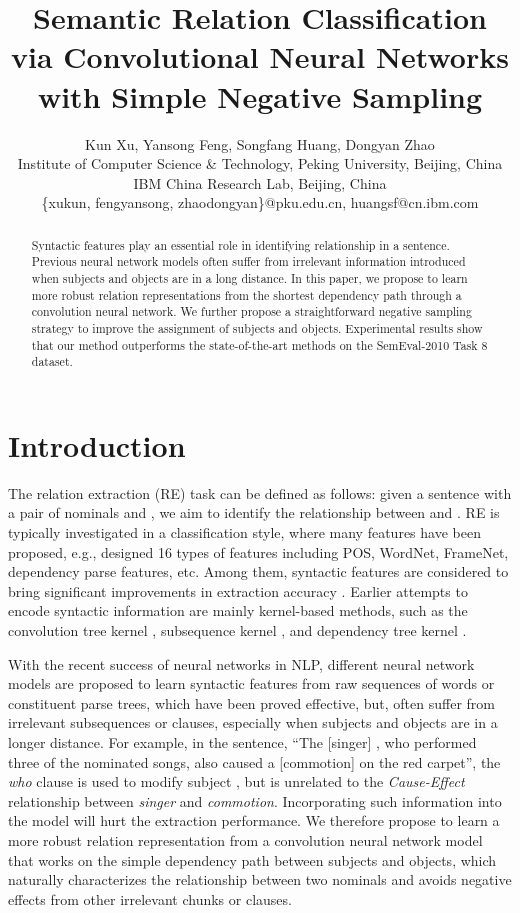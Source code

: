 \documentclass[11pt,a4paper]{article}
\title{Semantic Relation Classification via Convolutional Neural Networks with Simple Negative Sampling}
\author{Kun Xu, Yansong Feng, Songfang Huang, Dongyan Zhao\\
Institute of Computer Science \& Technology, Peking University, Beijing, China\\
IBM China Research Lab, Beijing, China \\
\{xukun, fengyansong, zhaodongyan\}@pku.edu.cn,  huangsf@cn.ibm.com\\
}
\date{}
\begin{document}
\maketitle
\begin{abstract}
Syntactic features play an essential role in identifying relationship in a sentence. Previous neural network models 
often suffer from irrelevant information introduced
when subjects and objects are in a long distance.  
In this paper, we propose to learn more robust relation representations from the shortest dependency path through a 
convolution neural network. We further propose
a straightforward negative sampling strategy to improve the assignment of subjects and objects.  
Experimental results show that our method outperforms the state-of-the-art methods on the SemEval-2010 Task 8 dataset.
\end{abstract}

\section{Introduction}
The relation extraction (RE) task can be defined as follows: given a sentence  with a pair of nominals  and , we aim to identify the relationship between  and . RE is typically investigated in a classification style, where many features have been proposed, e.g.,  
designed 16 types of features including POS, WordNet, FrameNet, dependency parse features, etc. Among them,  syntactic features are considered to bring significant improvements in extraction accuracy \cite{DBLP:conf/naacl/BunescuM05}. Earlier attempts to encode syntactic information are mainly kernel-based methods, such as the convolution tree kernel \cite{DBLP:conf/coling/QianZKZQ08}, subsequence kernel \cite{DBLP:conf/nips/BunescuM05}, and dependency tree kernel \cite{DBLP:conf/naacl/BunescuM05}. 

With the recent success of neural networks in NLP, different neural network models are proposed to learn syntactic features from raw sequences of words or constituent parse trees\cite{zeng-EtAl:2014:Coling,DBLP:conf/emnlp/SocherHMN12}, which have been proved effective, but, often suffer from irrelevant subsequences or clauses, especially when subjects and objects are in a longer distance. For example, in the sentence, ``The [singer] , who performed three of the nominated songs, also caused a [commotion] on the red carpet'', the \textit{who} clause is used to modify subject , but is unrelated to the \textit{Cause-Effect} relationship between \textit{singer} and \textit{commotion}. Incorporating such 
information into the model will hurt the extraction performance. We therefore propose to learn a more robust relation representation from a convolution neural network model that works on the simple dependency path between subjects and objects, which naturally characterizes the relationship between two nominals and avoids negative effects from other irrelevant chunks or clauses.
\end{document}
